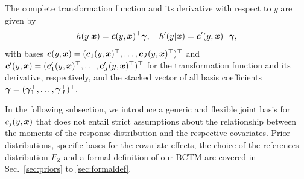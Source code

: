 \documentclass[12pt]{article}
\theoremstyle{plain}
\begin{document}
The complete transformation function and its derivative with respect to $y$ are  given by
\begin{align}\label{eq:full_h}
\begin{split}
h(y|\text{\boldmath$x$}) = \text{\boldmath$c$}(y,\text{\boldmath$x$})^\top \text{\boldmath$\gamma$}, \quad
h^\prime(y|\text{\boldmath$x$}) = \text{\boldmath$c$}^\prime(y,\text{\boldmath$x$})^\top \text{\boldmath$\gamma$},
\end{split}
\end{align}
with bases $\text{\boldmath$c$}(y,\text{\boldmath$x$}) = (\text{\boldmath$c$}_1(y, \text{\boldmath$x$})^\top, \ldots, \text{\boldmath$c$}_J(y,\text{\boldmath$x$})^\top)^\top$ and $\text{\boldmath$c$}^\prime(y,\text{\boldmath$x$}) = (\text{\boldmath$c$}^\prime_1(y, \text{\boldmath$x$})^\top, \ldots,\allowbreak \text{\boldmath$c$}^\prime_J(y,\text{\boldmath$x$})^\top)^\top$ for the transformation function and its derivative, respectively, and the stacked vector of all basis coefficients
$\text{\boldmath$\gamma$} = (\text{\boldmath$\gamma$}_1^\top, \ldots, \text{\boldmath$\gamma$}_J^\top)^\top.$

In the following subsection, we introduce a generic and flexible joint basis for $c_j(y,\text{\boldmath$x$})$ that does not entail strict assumptions about the relationship between the moments of the response distribution and the respective covariates. Prior distributions, specific bases for the covariate effects, the choice of the references distribution $F_Z$ and a formal definition of our BCTM are covered in Sec.~\ref{sec:priors} to \ref{sec:formaldef}.
\end{document}
